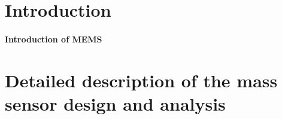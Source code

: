 \documentclass[a4paper,12pt,reqno]{report}
\begin{document}
\section{Introduction}
\label{sec:Introduction}
    \paragraph{Introduction of MEMS}

\newpage

\section{Detailed description of the mass sensor design and analysis}
\label{sec:Detailed description of the mass sensor design and analysis}
\end{document}
